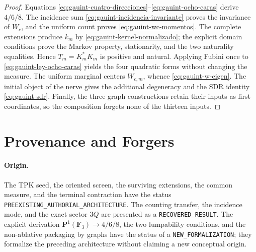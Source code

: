 \begin{proof}
Equations \eqref{eq:gauint-cuatro-direcciones}--\eqref{eq:gauint-ocho-caras} derive \(4/6/8\). The incidence sum \eqref{eq:gauint-incidencia-invariante} proves the invariance of \(W_c\), and the uniform count proves \eqref{eq:gauint-wc-momentos}. The complete extensions produce \(k_m\) by \eqref{eq:gauint-kernel-normalizado}; the explicit domain conditions prove the Markov property, stationarity, and the two naturality equalities. Hence \(T_m=K_m^*K_m\) is positive and natural. Applying Fubini once to \eqref{eq:gauint-ley-ocho-caras} yields the four quadratic forms without changing the measure. The uniform marginal centers \(W_{c,m}\), whence \eqref{eq:gauint-w-eigen}. The initial object of the nerve gives the additional degeneracy and the SDR identity \eqref{eq:gauint-sdr}. Finally, the three graph constructions retain their inputs as first coordinates, so the composition forgets none of the thirteen inputs.
\end{proof}

\section{Provenance and Forgers}

\paragraph{Origin.}
The TPK seed, the oriented screen, the surviving extensions, the common measure, and the terminal contraction have the status \texttt{PREEXISTING\_AUTHORIAL\_ARCHITECTURE}. The counting transfer, the incidence mode, and the exact sector \(3Q\) are presented as a \texttt{RECOVERED\_RESULT}. The explicit derivation \(\mathbf P^1(\mathbf F_3)\to4/6/8\), the two lumpability conditions, and the non-ablative packaging by graphs have the status of a \texttt{NEW\_FORMALIZATION}; they formalize the preceding architecture without claiming a new conceptual origin.

